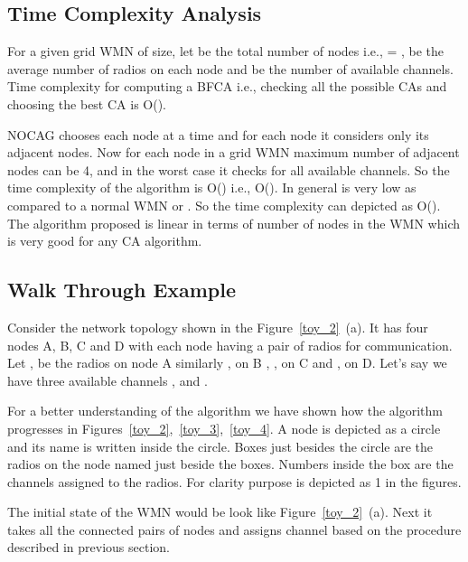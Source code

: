 \documentclass[conference]{IEEEtran}
\begin{document}
\subsection{Time Complexity Analysis} 
For a given grid WMN of  size, let  be the total number of nodes i.e.,  = ,  be the average number of radios on each node and
 be the number of available channels.
Time complexity for computing a BFCA i.e., checking all the possible CAs and choosing the best CA is O().


NOCAG chooses each node at a time and for each node it considers only its adjacent nodes.
Now for each node in a grid WMN maximum number of adjacent nodes can be 4, and in the worst case it checks for all available channels.
So the time complexity of the algorithm is O() i.e., O().
In general   is very low as compared to a normal WMN or . So the time complexity can depicted as O().
The algorithm proposed is linear in terms of number of nodes in the WMN which is very good for any CA algorithm.


\subsection{Walk Through Example}






Consider the network topology shown in the Figure~\ref{toy_2}~(a). It has four nodes A, B, C and D with each node having a pair of radios for communication. 
Let ,  be the radios on node A similarly ,  on B , , on C and ,  on D.
Let's say we have three available channels , and . 

For a better understanding of the algorithm we have shown how the algorithm progresses in Figures~\ref{toy_2},~\ref{toy_3},~\ref{toy_4}.
A node is depicted as a circle and its name is written inside the circle. 
Boxes just besides the circle are the radios on the node named just beside the boxes.
Numbers inside the box are the channels assigned to the radios. 
For clarity purpose  is depicted as 1 in the figures.

The initial state of the WMN would be look like Figure~\ref{toy_2}~(a).
Next it takes all the connected pairs of nodes and assigns channel based on the procedure described in previous section.
\end{document}
